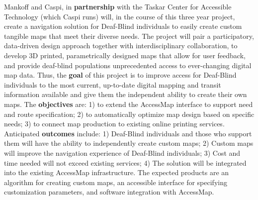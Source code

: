 Mankoff and Caspi, in \textbf{partnership} with the Taskar Center for Accessible Technology  (which Caspi runs)  will, in the course of this three year project, create a navigation solution for Deaf-Blind individuals to easily create custom tangible maps that meet their diverse needs. 
 The project will pair a participatory, data-driven design approach together with interdisciplinary collaboration, to develop 3D printed, parametrically designed maps that allow for user feedback, and provide deaf-blind populations unprecedented access to ever-changing digital map data. Thus, the \textbf{goal} of this project is to improve access for Deaf-Blind individuals to the most current, up-to-date digital mapping and transit information available
and give them the independent ability to create their own maps.  The \textbf{objectives} are: 1) to extend the AccessMap interface to support need and route specification; 2) to automatically optimize map design based on specific needs; 3) to connect map production to existing online printing services. Anticipated \textbf{outcomes} include: 1) Deaf-Blind individuals and those who support them will have the ability to independently create custom maps; 2) Custom maps will improve the navigation experience of Deaf-Blind individuals; 3) Cost and time needed will not exceed existing services; 4) The solution will be integrated into the existing AccessMap infrastructure. The expected products are an algorithm for creating custom maps, an accessible interface for specifying customization parameters, and software integration with AccessMap. 